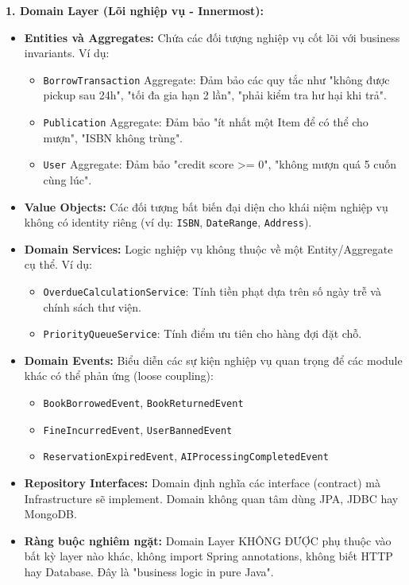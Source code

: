 \textbf{1. Domain Layer (Lõi nghiệp vụ - Innermost):}
\begin{itemize}
    \item \textbf{Entities và Aggregates:} Chứa các đối tượng nghiệp vụ cốt lõi với business invariants. Ví dụ:
    \begin{itemize}
        \item \texttt{BorrowTransaction} Aggregate: Đảm bảo các quy tắc như "không được pickup sau 24h", "tối đa gia hạn 2 lần", "phải kiểm tra hư hại khi trả".
        \item \texttt{Publication} Aggregate: Đảm bảo "ít nhất một Item để có thể cho mượn", "ISBN không trùng".
        \item \texttt{User} Aggregate: Đảm bảo "credit score >= 0", "không mượn quá 5 cuốn cùng lúc".
    \end{itemize}
    
    \item \textbf{Value Objects:} Các đối tượng bất biến đại diện cho khái niệm nghiệp vụ không có identity riêng (ví dụ: \texttt{ISBN}, \texttt{DateRange}, \texttt{Address}).
    
    \item \textbf{Domain Services:} Logic nghiệp vụ không thuộc về một Entity/Aggregate cụ thể. Ví dụ:
    \begin{itemize}
        \item \texttt{OverdueCalculationService}: Tính tiền phạt dựa trên số ngày trễ và chính sách thư viện.
        \item \texttt{PriorityQueueService}: Tính điểm ưu tiên cho hàng đợi đặt chỗ.
    \end{itemize}
    
    \item \textbf{Domain Events:} Biểu diễn các sự kiện nghiệp vụ quan trọng để các module khác có thể phản ứng (loose coupling):
    \begin{itemize}
        \item \texttt{BookBorrowedEvent}, \texttt{BookReturnedEvent}
        \item \texttt{FineIncurredEvent}, \texttt{UserBannedEvent}
        \item \texttt{ReservationExpiredEvent}, \texttt{AIProcessingCompletedEvent}
    \end{itemize}
    
    \item \textbf{Repository Interfaces:} Domain định nghĩa các interface (contract) mà Infrastructure sẽ implement. Domain không quan tâm dùng JPA, JDBC hay MongoDB.
    
    \item \textbf{Ràng buộc nghiêm ngặt:} Domain Layer KHÔNG ĐƯỢC phụ thuộc vào bất kỳ layer nào khác, không import Spring annotations, không biết HTTP hay Database. Đây là "business logic in pure Java".
\end{itemize}

